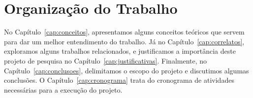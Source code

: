 \section{Organização do Trabalho}
\label{sec:organizacao_trabalho}


No Capítulo~\ref{cap:conceitos}, apresentamos alguns conceitos teóricos que servem para dar um melhor entendimento do trabalho. Já no Capítulo~\ref{cap:correlatos}, exploramos alguns trabalhos relacionados, e justificamos a importância deste projeto de pesquisa no Capítulo~\ref{cap:justificativas}. Finalmente, no Capítulo~\ref{cap:conclusoes}, delimitamos o escopo do projeto e discutimos algumas conclusões. O Capítulo~\ref{cap:cronograma} trata do cronograma de atividades necessárias para a execução do projeto.
